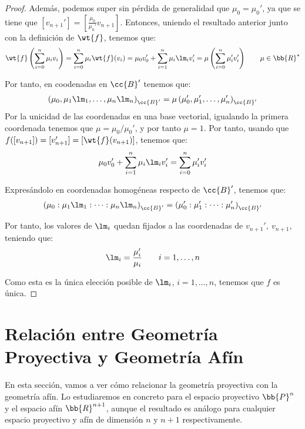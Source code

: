 \begin{proof}
    Además, podemos super sin pérdida de generalidad que $\mu_0 = \mu_0'$, ya que se tiene que $[v_{n+1}'] = \left[\frac{\mu_0}{\mu_0'}v_{n+1}\right]$. Entonces, uniendo el
    resultado anterior junto con la definición de $\wt{f}$, tenemos que:
    \begin{equation*}
        \wt{f}\left(\sum_{i=0}^n \mu_i v_i\right)
        = \sum_{i=0}^n \mu_i \wt{f}(v_i)
        = \mu_0v_0' + \sum_{i=1}^n \mu_i \lm_i v_i'
        = \mu \left(\sum_{i=0}^n \mu_i' v_i'\right) \qquad \mu \in \bb{R}^\ast
    \end{equation*}

    Por tanto, en coodenadas en $\cc{B}'$ tenemos que:
    \begin{equation*}
        \left(\mu_0, \mu_1 \lm_1, \dots, \mu_n \lm_n\right)_{\cc{B}'}
        = \mu \left(\mu_0', \mu_1', \dots, \mu_n'\right)_{\cc{B}'}
    \end{equation*}
    Por la unicidad de las coordenadas en una base vectorial, igualando la primera coordenada tenemos que $\mu = \mu_0/\mu_0'$, y por tanto $\mu=1$.
    Por tanto, usando que $f([v_{n+1}]) = [v_{n+1}'] = [\wt{f}(v_{n+1})]$, tenemos que:
    \begin{equation*}
        \mu_0v_0' + \sum_{i=1}^n \mu_i \lm_i v_i'
        = \sum_{i=0}^n \mu_i' v_i'
    \end{equation*}

    Expresándolo en coordenadas homogéneas respecto de $\cc{B}'$, tenemos que:
    \begin{equation*}
        \left(\mu_0: \mu_1 \lm_1: \dots: \mu_n \lm_n\right)_{\cc{B}'}
        = \left(\mu_0': \mu_1': \dots: \mu_n'\right)_{\cc{B}'}
    \end{equation*}

    Por tanto, los valores de $\lm_i$ quedan fijados a las coordenadas de $v_{n+1}',~v_{n+1}$, teniendo que:
    \begin{equation*}
        \lm_i = \frac{\mu_i'}{\mu_i} \qquad i=1,\dots,n
    \end{equation*}

    Como esta es la única elección posible de $\lm_i$, $i=1,\dots,n$, tenemos que $f$ es única.
\end{proof}

\section{Relación entre Geometría Proyectiva y Geometría Afín}

En esta sección, vamos a ver cómo relacionar la geometría proyectiva con la geometría afín.
Lo estudiaremos en concreto para el espacio proyectivo $\bb{P}^n$ y el espacio afín $\bb{R}^{n+1}$,
aunque el resultado es análogo para cualquier espacio proyectivo y afín de dimensión $n$ y $n+1$ respectivamente.

